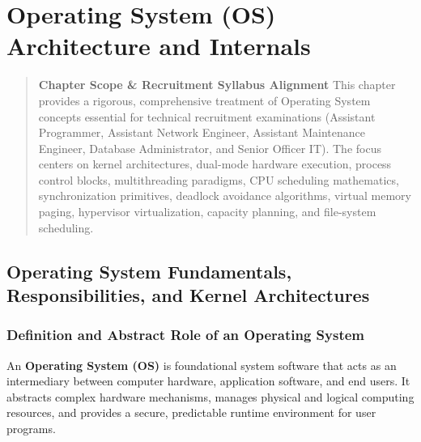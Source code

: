 \chapter{Operating System (OS) Architecture and Internals}
\label{ch:operating_system}

\begin{quote}
\textbf{Chapter Scope \& Recruitment Syllabus Alignment}
This chapter provides a rigorous, comprehensive treatment of Operating System concepts essential for technical recruitment examinations (Assistant Programmer, Assistant Network Engineer, Assistant Maintenance Engineer, Database Administrator, and Senior Officer IT). The focus centers on kernel architectures, dual-mode hardware execution, process control blocks, multithreading paradigms, CPU scheduling mathematics, synchronization primitives, deadlock avoidance algorithms, virtual memory paging, hypervisor virtualization, capacity planning, and file-system scheduling.
\end{quote}

\section{Operating System Fundamentals, Responsibilities, and Kernel Architectures}
\label{sec:os_fundamentals}

\subsection{Definition and Abstract Role of an Operating System}
An \textbf{Operating System (OS)} is foundational system software that acts as an intermediary between computer hardware, application software, and end users. It abstracts complex hardware mechanisms, manages physical and logical computing resources, and provides a secure, predictable runtime environment for user programs.

